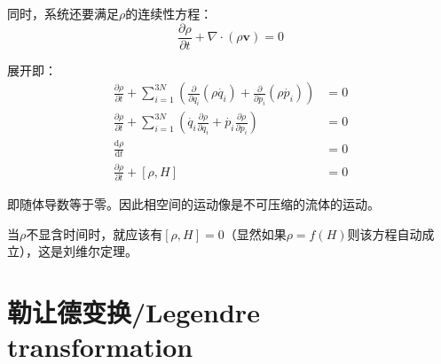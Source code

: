 \documentclass[a4paper, 10pt, openany]{book}%
\begin{document}
同时，系统还要满足$\rho$的连续性方程：
\begin{equation}
  \frac{\partial \rho}{\partial t}+\nabla\cdot(\rho\textbf{v})=0
\end{equation}

展开即：
\begin{align}
  \frac{\partial \rho}{\partial t}+\sum_{i=1}^{3N}\left(\frac{\partial}{\partial q_i}(\rho \dot{q_i})+\frac{\partial}{\partial p_i}(\rho \dot{p_i})\right)&=0\\
  \frac{\partial \rho}{\partial t}+\sum_{i=1}^{3N}\left(\dot{q_i}\frac{\partial\rho}{\partial q_i}+\dot{p_i}\frac{\partial \rho}{\partial p_i}\right)&=0\\
  \frac{\mathrm{d}\rho}{\mathrm{d}t}&=0\\
  \frac{\partial \rho}{\partial t}+[\rho,H]&=0
\end{align}

即随体导数等于零。因此相空间的运动像是不可压缩的流体的运动。

当$\rho$不显含时间时，就应该有$[\rho,H]=0$（显然如果$\rho=f(H)$则该方程自动成立），这是刘维尔定理。



























\newpage
\appendix
\chapter{勒让德变换/Legendre transformation}
\end{document}
